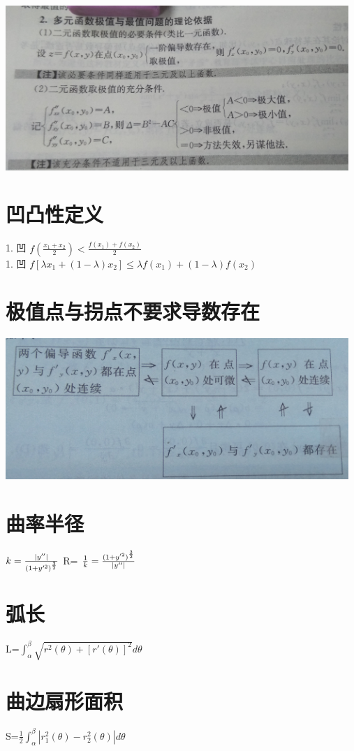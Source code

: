 \documentclass[UTF8]{ctexart}
\begin{document}
\includegraphics[width=13cm]{9345E7/2805530637.jpg}

\section{凹凸性定义}
    1. 凹  $ f(\frac{x_1+x_2}{2}) < \frac{f(x_1)+f(x_2)}{2}$   \\
    1. 凹  $ f[λx_1 +(1-λ)x_2] \leq λf(x_1)+(1-λ)f(x_2)$  \\

\section{极值点与拐点不要求导数存在}
\includegraphics[width=13cm]{9345E7/2367085874.jpg}

\section{曲率半径}
$ k= \frac{|y''|}{{(1+y'^2)}^{3 \over 2}}$
R= $ \frac{1}{k}=\frac{{(1+y'^2)}^{3 \over 2}}{|y''|}$

\section{弧长}
L=$ \int_α^β \sqrt{r^2(θ)+[r'(θ)]^2}dθ$
\section{曲边扇形面积}
 S=$ \frac{1}{2} \int_α^β|r_1^2(θ)-r_2^2(θ)|dθ$
\end{document}
